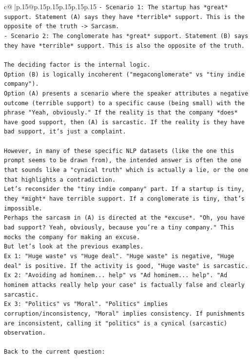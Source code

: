 \documentclass{article}
\begin{document}
{\begin{supertabular}{c@{$\;$}|p{.15\linewidth}@{}p{.15\linewidth}p{.15\linewidth}p{.15\linewidth}p{.15\linewidth}p{.15\linewidth}}
{{{\texttt{{-} Scenario 1: The startup has *great* support. Statement (A) says they have *terrible* support. This is the opposite of the truth {-}> Sarcasm.} \\
\texttt{{-} Scenario 2: The conglomerate has *great* support. Statement (B) says they have *terrible* support. This is also the opposite of the truth.} \\
\\ 
\texttt{The deciding factor is the internal logic.} \\
\texttt{Option (B) is logically incoherent ("megaconglomerate" vs "tiny indie company").} \\
\texttt{Option (A) presents a scenario where the speaker attributes a negative outcome (terrible support) to a specific cause (being small) with the phrase "Yeah, obviously." If the reality is that the company *does* have good support, then (A) is sarcastic. If the reality is they have bad support, it's just a complaint.} \\
\\ 
\texttt{However, in many of these specific NLP datasets (like the one this prompt seems to be drawn from), the intended answer is often the one that sounds like a "cynical truth" which is actually a lie, or the one that highlights a contradiction.} \\
\texttt{Let's reconsider the "tiny indie company" part. If a startup is tiny, they *might* have terrible support. If a conglomerate is tiny, that's impossible.} \\
\texttt{Perhaps the sarcasm in (A) is directed at the *excuse*. "Oh, you have bad support? Yeah, obviously, because you're a tiny company." This mocks the company for making an excuse.} \\
\texttt{But let's look at the previous examples.} \\
\texttt{Ex 1: "Huge waste" vs "Huge deal". "Huge waste" is negative, "Huge deal" is positive. If the activity is good, "Huge waste" is sarcastic.} \\
\texttt{Ex 2: "Avoiding ad hominem... help" vs "Ad hominem... help". "Ad hominem attacks really help your case" is factually false and clearly sarcastic.} \\
\texttt{Ex 3: "Politics" vs "Moral". "Politics" implies corruption/inconsistency, "Moral" implies consistency. If punishments are inconsistent, calling it "politics" is a cynical (sarcastic) observation.} \\
\\ 
\texttt{Back to the current question:} \\
}}}
\end{supertabular}}
\end{document}
